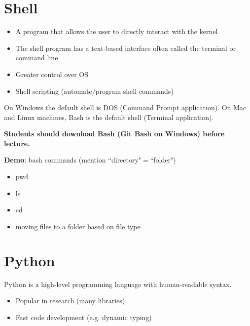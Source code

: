 \documentclass[12pt]{article}
\numberwithin{equation}{section}
\begin{document}
\section{Shell}
\begin{itemize}
    \item A program that allows the user to directly interact with the kernel
    \item The shell program has a text-based interface often called the terminal or command line
    \item Greater control over OS
    \item Shell scripting (automate/program shell commands)
\end{itemize}

On Windows the default shell is DOS (Command Prompt application). On Mac and Linux machines, Bash is the default shell (Terminal application).

\textbf{Students should download Bash (Git Bash on Windows) before lecture.
}

\textbf{Demo}: bash commands (mention ``directory"$=$``folder")
\begin{itemize}
    \item pwd
    \item ls
    \item cd
    \item moving files to a folder based on file type
\end{itemize}

\section{Python}

Python is a high-level programming language with human-readable syntax.
\begin{itemize}
    \item Popular in research (many libraries)
    \item Fast code development (e.g. dynamic typing) 
\end{itemize}
\end{document}
